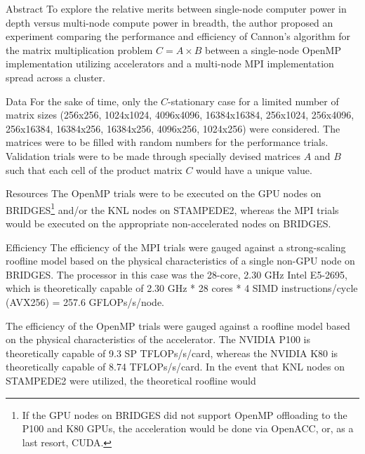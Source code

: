 \documentclass{article}
\begin{document}
\tableofcontents

\begin{section}{Abstract}
  To explore the relative merits between single-node computer power in depth versus multi-node compute power in breadth,
  the author proposed an experiment comparing the performance and efficiency of Cannon's algorithm\autocites{Lecture17Slides,GuptaSadayappan}
  for the matrix multiplication problem $C = A \times B$ between a single-node OpenMP\autocite{openmp45spec} implementation utilizing accelerators and a multi-node MPI\autocite{MPIReport31}
  implementation spread across a cluster.
  \begin{subsection}{Data}
    For the sake of time, only the $C$-stationary case for a limited number of matrix sizes
    (256x256, 1024x1024, 4096x4096, 16384x16384, 256x1024, 256x4096, 256x16384, 16384x256, 16384x256, 4096x256, 1024x256)
    were considered. The matrices were to be filled with random numbers for the performance trials. Validation trials were to be made
    through specially devised matrices $A$ and $B$ such that each cell of the product matrix $C$ would have a unique value.
  \end{subsection}
  \begin{subsection}{Resources}
    The OpenMP trials were to be executed on the GPU nodes on BRIDGES\footnote{If the GPU nodes on BRIDGES did not support
    OpenMP offloading to the P100 and K80 GPUs, the acceleration would be done via OpenACC\autocite{OpenACCStd}, or, as a last resort, CUDA.}
    and/or the KNL nodes on STAMPEDE2, whereas the MPI trials would be executed on the appropriate non-accelerated nodes
    on BRIDGES.
  \end{subsection}
  \begin{subsection}{Efficiency}
    The efficiency of the MPI trials were gauged against a strong-scaling roofline model based on the physical
    characteristics of a single non-GPU node on BRIDGES. The processor in this case was the 28-core, 2.30 GHz Intel E5-2695,
    which is theoretically capable of 2.30 GHz * 28 cores * 4 SIMD instructions/cycle (AVX256) = 257.6 GFLOPs/s/node.
    \begin{paragraph}{}
      The efficiency of the OpenMP trials were gauged against a roofline model based on the physical characteristics of the accelerator.
      The NVIDIA P100 is theoretically capable of 9.3 SP TFLOPs/s/card\autocite{P100Datasheet}, whereas the NVIDIA K80 is theoretically capable of
      8.74 TFLOPs/s/card\autocite{AnandtechK80}. In the event that KNL nodes on STAMPEDE2 were utilized, the theoretical roofline would

\end{paragraph}
\end{subsection}
\end{section}
\end{document}
